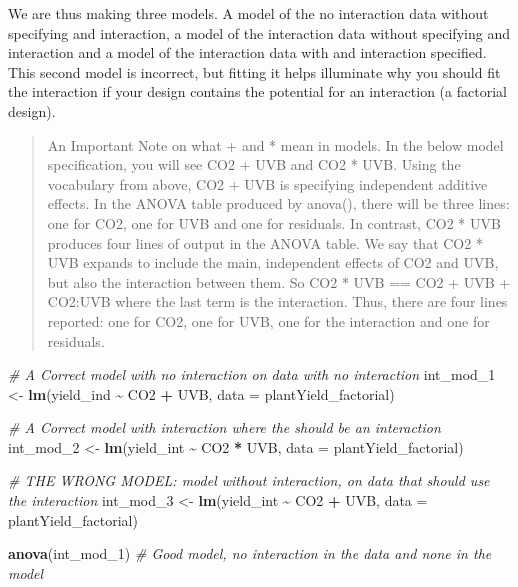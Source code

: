 \documentclass[
]{book}
\newenvironment{Shaded}{\begin{snugshade}}{\end{snugshade}}
\newcommand{\AttributeTok}[1]{\textcolor[rgb]{0.13,0.29,0.53}{#1}}
\newcommand{\CommentTok}[1]{\textcolor[rgb]{0.56,0.35,0.01}{\textit{#1}}}
\newcommand{\FunctionTok}[1]{\textcolor[rgb]{0.13,0.29,0.53}{\textbf{#1}}}
\newcommand{\NormalTok}[1]{#1}
\newcommand{\OtherTok}[1]{\textcolor[rgb]{0.56,0.35,0.01}{#1}}
\newcommand{\SpecialCharTok}[1]{\textcolor[rgb]{0.81,0.36,0.00}{\textbf{#1}}}
\begin{document}
We are thus making three models. A model of the no interaction data without specifying and interaction, a model of the interaction data without specifying and interaction and a model of the interaction data with and interaction specified. This second model is incorrect, but fitting it helps illuminate why you should fit the interaction if your design contains the potential for an interaction (a factorial design).

\begin{quote}
An Important Note on what + and * mean in models. In the below model specification, you will see CO2 + UVB and CO2 * UVB. Using the vocabulary from above, CO2 + UVB is specifying independent additive effects. In the ANOVA table produced by anova(), there will be three lines: one for CO2, one for UVB and one for residuals. In contrast, CO2 * UVB produces four lines of output in the ANOVA table. We say that CO2 * UVB expands to include the main, independent effects of CO2 and UVB, but also the interaction between them. So CO2 * UVB == CO2 + UVB + CO2:UVB where the last term is the interaction. Thus, there are four lines reported: one for CO2, one for UVB, one for the interaction and one for residuals.
\end{quote}

\begin{Shaded}
\begin{Highlighting}[]
\CommentTok{\# A Correct model with no interaction on data with no interaction}
\NormalTok{int\_mod\_1 }\OtherTok{\textless{}{-}} \FunctionTok{lm}\NormalTok{(yield\_ind }\SpecialCharTok{\textasciitilde{}}\NormalTok{ CO2 }\SpecialCharTok{+}\NormalTok{ UVB, }\AttributeTok{data =}\NormalTok{ plantYield\_factorial)}

\CommentTok{\# A Correct model with interaction where the should be an interaction}
\NormalTok{int\_mod\_2 }\OtherTok{\textless{}{-}} \FunctionTok{lm}\NormalTok{(yield\_int }\SpecialCharTok{\textasciitilde{}}\NormalTok{ CO2 }\SpecialCharTok{*}\NormalTok{ UVB, }\AttributeTok{data =}\NormalTok{ plantYield\_factorial)}

\CommentTok{\# THE WRONG MODEL: model without interaction, on data that should use the interaction}
\NormalTok{int\_mod\_3 }\OtherTok{\textless{}{-}} \FunctionTok{lm}\NormalTok{(yield\_int }\SpecialCharTok{\textasciitilde{}}\NormalTok{ CO2 }\SpecialCharTok{+}\NormalTok{ UVB, }\AttributeTok{data =}\NormalTok{ plantYield\_factorial)}

\FunctionTok{anova}\NormalTok{(int\_mod\_1) }\CommentTok{\# Good model, no interaction in the data and none in the model}
\end{Highlighting}
\end{Shaded}
\end{document}
